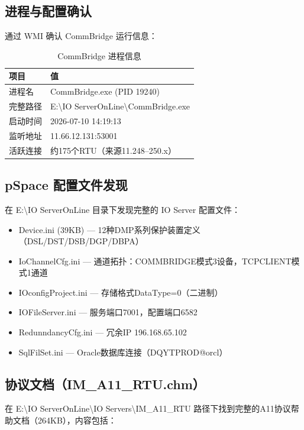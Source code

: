 \documentclass[12pt,a4paper]{ctexart}
\begin{document}
\subsection{进程与配置确认}

通过 WMI 确认 CommBridge 运行信息：

\begin{table}[H]\centering
\caption{CommBridge 进程信息}
\begin{tabular}{ll}
\toprule
\textbf{项目} & \textbf{值} \\
\midrule
进程名 & CommBridge.exe (PID 19240) \\
完整路径 & E:\textbackslash IO ServerOnLine\textbackslash CommBridge.exe \\
启动时间 & 2026-07-10 14:19:13 \\
监听地址 & 11.66.12.131:53001 \\
活跃连接 & 约175个RTU（来源11.248--250.x） \\
\bottomrule
\end{tabular}
\end{table}

\subsection{pSpace 配置文件发现}

在 E:\textbackslash IO ServerOnLine 目录下发现完整的 IO Server 配置文件：

\begin{itemize}[leftmargin=*]
\item Device.ini (39KB) — 12种DMP系列保护装置定义（DSL/DST/DSB/DGP/DBPA）
\item IoChannelCfg.ini — 通道拓扑：COMMBRIDGE模式3设备，TCPCLIENT模式1通道
\item IOconfigProject.ini — 存储格式DataType=0（二进制）
\item IOFileServer.ini — 服务端口7001，配置端口6582
\item RedunndancyCfg.ini — 冗余IP 196.168.65.102
\item SqlFilSet.ini — Oracle数据库连接（DQYTPROD@orcl）
\end{itemize}

\subsection{协议文档（IM\_A11\_RTU.chm）}

在 E:\textbackslash IO ServerOnLine\textbackslash IO Servers\textbackslash IM\_A11\_RTU 路径下找到完整的A11协议帮助文档（264KB），内容包括：
\end{document}

